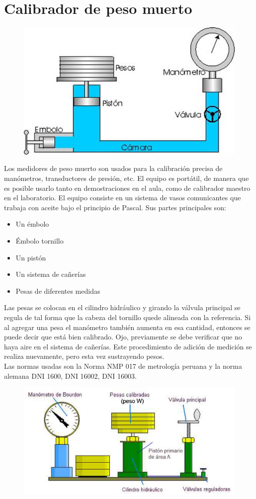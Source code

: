 \documentclass[a4paper,12pt]{report}
\begin{document}
\section{Calibrador de peso muerto}
\begin{figure}[H]
\centering
\includegraphics[scale=0.7]{muerto1.png}
\end{figure}
Los medidores de peso muerto son usados para la calibración precisa de manómetros, transductores de presión, etc. El equipo es portátil, de manera que es posible usarlo tanto en demostraciones en el aula, como de calibrador maestro en el laboratorio. El equipo consiste en un sistema de vasos comunicantes que trabaja con aceite bajo el principio de Pascal. Sus partes principales son:
\begin{itemize}
\item Un émbolo
\item Émbolo tornillo
\item Un pistón
\item Un sistema de cañerías
\item Pesas de diferentes medidas
\end{itemize}
Las pesas se colocan en el cilindro hidráulico y girando la válvula principal se regula de tal forma que la cabeza del tornillo quede alineada con la referencia. Si al agregar una pesa el manómetro también aumenta en esa cantidad, entonces se puede decir que está bien calibrado. Ojo, previamente se debe verificar que no haya aire en el sistema de cañerías. Este procedimiento de adición de medición se realiza nuevamente, pero esta vez sustrayendo pesos.\\
Las normas usadas son la Norma NMP 017 de metrología peruana y la norma alemana DNI 1600, DNI 16002, DNI 16003.
\begin{figure}[H]
\centering
\includegraphics[scale=0.8]{muerto2.png}
\end{figure}
\end{document}
